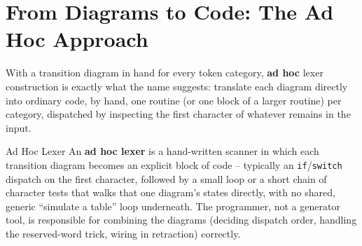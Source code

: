 \documentclass[full-course-notes.tex]{subfiles}
\begin{document}
\section{From Diagrams to Code: The Ad Hoc Approach}
\label{sec:l7-adhoc}

\dbtag With a transition diagram in hand for every token category, \textbf{ad hoc} lexer
construction is exactly what the name suggests: translate each diagram directly into ordinary
code, by hand, one routine (or one block of a larger routine) per category, dispatched by
inspecting the first character of whatever remains in the input.

\begin{defbox}{Ad Hoc Lexer}
An \textbf{ad hoc lexer} is a hand-written scanner in which each transition diagram becomes an
explicit block of code -- typically an \texttt{if}/\texttt{switch} dispatch on the first
character, followed by a small loop or a short chain of character tests that walks that one
diagram's states directly, with no shared, generic ``simulate a table'' loop underneath. The
programmer, not a generator tool, is responsible for combining the diagrams (deciding dispatch
order, handling the reserved-word trick, wiring in retraction) correctly.
\end{defbox}
\end{document}
